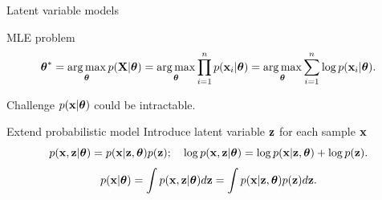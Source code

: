 \begin{frame}{Latent variable models}
    \begin{block}{MLE problem}
    \vspace{-0.3cm}
    \[
        \boldsymbol{\theta}^* = \operatorname*{arg\,max}_{\boldsymbol{\theta}} p(\mathbf{X} | \boldsymbol{\theta}) = \operatorname*{arg\,max}_{\boldsymbol{\theta}} \prod_{i=1}^n p(\mathbf{x}_i | \boldsymbol{\theta}) = \operatorname*{arg\,max}_{\boldsymbol{\theta}} \sum_{i=1}^n \log p(\mathbf{x}_i | \boldsymbol{\theta}).
    \]
    \vspace{-0.3cm}
    \end{block}
    \begin{block}{Challenge}
    $p(\mathbf{x} | \boldsymbol{\theta})$ could be intractable.
    \end{block}
    \begin{block}{Extend probabilistic model}
    Introduce latent variable $\mathbf{z}$ for each sample $\mathbf{x}$
    \[
        p(\mathbf{x}, \mathbf{z} | \boldsymbol{\theta}) = p(\mathbf{x} | \mathbf{z}, \boldsymbol{\theta}) p(\mathbf{z}); \quad 
        \log p(\mathbf{x}, \mathbf{z} | \boldsymbol{\theta}) = \log p(\mathbf{x} | \mathbf{z}, \boldsymbol{\theta}) + \log p(\mathbf{z}).
    \]
    \[
        p(\mathbf{x} | \boldsymbol{\theta}) = \int p(\mathbf{x}, \mathbf{z} | \boldsymbol{\theta}) d\mathbf{z} = \int p(\mathbf{x} | \mathbf{z}, \boldsymbol{\theta}) p(\mathbf{z}) d\mathbf{z}.
    \]
    \end{block}
\end{frame}
